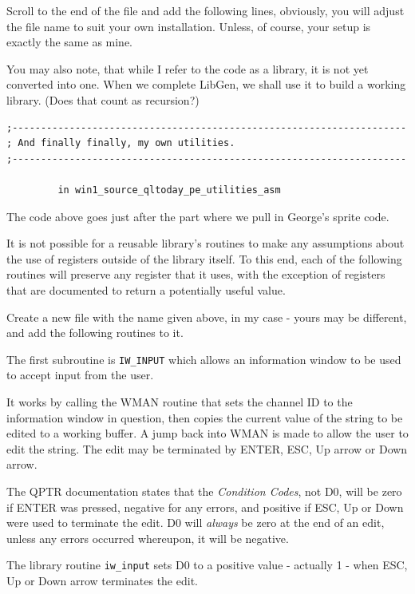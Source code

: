 Scroll to the end of the file and add the following lines,
    obviously, you will adjust the file name to suit your own installation.
    Unless, of course, your setup is exactly the same as mine.

You may also note, that while I refer to the code as a library, it
    is not yet converted into one. When we complete
 LibGen, we shall use it to build a working
    library. (Does that count as recursion?)

\begin{lstlisting}[firstnumber=1,]
;---------------------------------------------------------------------
; And finally finally, my own utilities.
;---------------------------------------------------------------------

         in win1_source_qltoday_pe_utilities_asm
\end{lstlisting}

The code above goes just after the part where we pull in George's
    sprite code.

It is not possible for a reusable library's routines to make any
    assumptions about the use of registers outside of the library itself. To
    this end, each of the following routines will preserve any register that
    it uses, with the exception of registers that are documented to return a
    potentially useful value.

Create a new file with the name given above, in my case -{} yours may
    be different, and add the following routines to it.

The first subroutine is \texttt{IW\_INPUT} which allows
    an information window to be used to accept input from the user.

It works by calling the WMAN routine that
    sets the channel ID to the information window in question, then copies the
    current value of the string to be edited to a working buffer. A jump back
    into WMAN is made to allow the user to edit the
    string. The edit may be terminated by ENTER, ESC, Up arrow or Down
    arrow.

\begin{note}
The QPTR documentation states that the \emph{Condition
      Codes}, not D0, will be zero if ENTER was pressed, negative
      for any errors, and positive if ESC, Up or Down were used to terminate
      the edit. D0 will \emph{always} be zero at the end of an
      edit, unless any errors occurred whereupon, it will be negative.

The library routine \texttt{iw\_input} sets D0 to a
      positive value -{} actually 1 -{} when ESC, Up or Down arrow terminates the
      edit.
\end{note}

